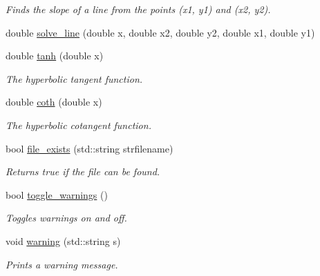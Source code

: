 \begin{DoxyCompactItemize}
\begin{DoxyCompactList}\small\item\em Finds the slope of a line from the points ({\itshape x1}, {\itshape y1}) and ({\itshape x2}, {\itshape y2}). \end{DoxyCompactList}\item 
double \hyperlink{namespacepyne_a943fe41cf25ff550684aabffe5971e1e}{solve\+\_\+line} (double x, double x2, double y2, double x1, double y1)
\item 
double \hyperlink{namespacepyne_a598ae3065c54502a23495eaf06865d1d}{tanh} (double x)\hypertarget{namespacepyne_a598ae3065c54502a23495eaf06865d1d}{}\label{namespacepyne_a598ae3065c54502a23495eaf06865d1d}

\begin{DoxyCompactList}\small\item\em The hyperbolic tangent function. \end{DoxyCompactList}\item 
double \hyperlink{namespacepyne_a03cad3093b97f2f6a5dcb5cdc4cb562e}{coth} (double x)\hypertarget{namespacepyne_a03cad3093b97f2f6a5dcb5cdc4cb562e}{}\label{namespacepyne_a03cad3093b97f2f6a5dcb5cdc4cb562e}

\begin{DoxyCompactList}\small\item\em The hyperbolic cotangent function. \end{DoxyCompactList}\item 
bool \hyperlink{namespacepyne_ad514c252885b18fb9c6ef3ac5f0ac680}{file\+\_\+exists} (std\+::string strfilename)\hypertarget{namespacepyne_ad514c252885b18fb9c6ef3ac5f0ac680}{}\label{namespacepyne_ad514c252885b18fb9c6ef3ac5f0ac680}

\begin{DoxyCompactList}\small\item\em Returns true if the file can be found. \end{DoxyCompactList}\item 
bool \hyperlink{namespacepyne_a6dea834f084c2ff3a3c8ce67c3eaf8e1}{toggle\+\_\+warnings} ()\hypertarget{namespacepyne_a6dea834f084c2ff3a3c8ce67c3eaf8e1}{}\label{namespacepyne_a6dea834f084c2ff3a3c8ce67c3eaf8e1}

\begin{DoxyCompactList}\small\item\em Toggles warnings on and off. \end{DoxyCompactList}\item 
void \hyperlink{namespacepyne_ab952e7e8ee07bf181ad5439e27ae1604}{warning} (std\+::string s)\hypertarget{namespacepyne_ab952e7e8ee07bf181ad5439e27ae1604}{}\label{namespacepyne_ab952e7e8ee07bf181ad5439e27ae1604}

\begin{DoxyCompactList}\small\item\em Prints a warning message. \end{DoxyCompactList}\end{DoxyCompactItemize}
